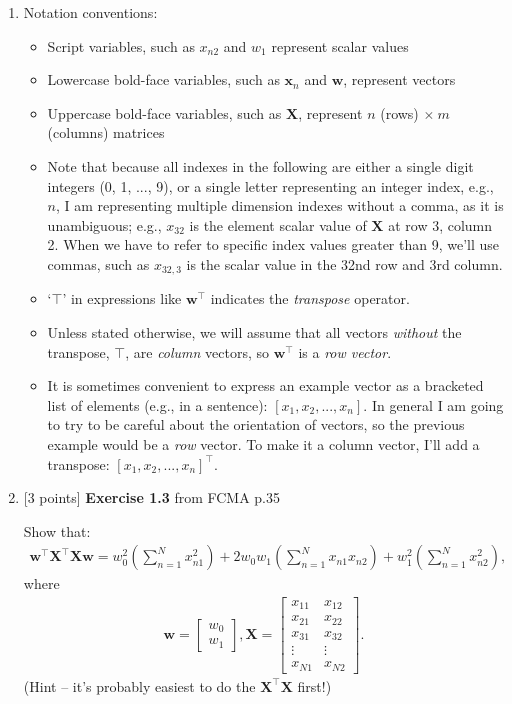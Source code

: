\documentclass[10pt]{article}
\begin{document}
\begin{enumerate}
\item[] Notation conventions:
\begin{itemize}
\item Script variables, such as $x_{n2}$ and $w_1$ represent scalar values
\item Lowercase bold-face variables, such as $\mathbf{x}_n$ and $\mathbf{w}$, represent vectors
\item Uppercase bold-face variables, such as $\mathbf{X}$, represent $n$ (rows) $\times ~m$ (columns) matrices
\item Note that because all indexes in the following are either a single digit integers (0, 1, ..., 9), or a single letter representing an integer index, e.g., $n$, I am representing multiple dimension indexes without a comma, as it is unambiguous; e.g., $x_{32}$ is the element scalar value of $\mathbf{X}$ at row 3, column 2.  When we have to refer to specific index values greater than 9, we'll use commas, such as $x_{32,3}$ is the scalar value in the 32nd row and 3rd column.
\item `$\top$' in expressions like $\mathbf{w}^\top$ indicates the {\em transpose} operator.
\item Unless stated otherwise, we will assume that all vectors {\em without} the transpose, $\top$, are {\em column} vectors, so $\mathbf{w}^\top$ is a {\em row vector}.
\item It is sometimes convenient to express an example vector as a bracketed list of elements (e.g., in a sentence): $[x_1, x_2, ..., x_n]$.  In general I am going to try to be careful about the orientation of vectors, so the previous example would be a {\em row} vector.  To make it a column vector, I'll add a transpose: $[x_1, x_2, ..., x_n]^\top$.
\end{itemize}
\vspace{1cm}




\item \label{prob:3} [3 points]
{\bf Exercise 1.3} from FCMA p.35

Show that:
\begin{eqnarray*}
\mathbf{w}^\top\mathbf{X}^\top\mathbf{X}\mathbf{w} = w_0^2 \left( \sum_{n=1}^N x_{n1}^2 \right) + 2w_0w_1 \left( \sum_{n=1}^N x_{n1}x_{n2} \right) + w_1^2 \left( \sum_{n=1}^N x_{n2}^2 \right),
\end{eqnarray*}
where
\begin{eqnarray*}
\mathbf{w} = 
    \begin{bmatrix}
    w_0 \\[0.3em]
    w_1
    \end{bmatrix}
    ,
\mathbf{X} = 
    \begin{bmatrix}
    x_{11} & x_{12} \\[0.3em]
    x_{21} & x_{22} \\[0.3em]
    x_{31} & x_{32} \\[0.3em]
    \vdots & \vdots \\[0.3em]
    x_{N1} & x_{N2}
    \end{bmatrix}
    .
\end{eqnarray*}
(Hint -- it's probably easiest to do the $\mathbf{X}^\top\mathbf{X}$ first!)


\end{enumerate}
\end{document}

